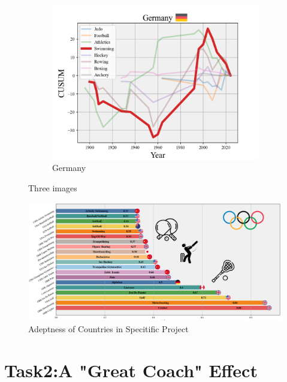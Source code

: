 \documentclass[12pt]{article}  %
\begin{document}
\begin{figure}[htbp]
\begin{subfigure}[b]{.32\textwidth}
		\includegraphics[width=\textwidth]{img/Decline3.png}
		\caption{Germany}\label{subfig:3}
	\end{subfigure}
	\caption{Three images}\label{fig:subfigures}
\end{figure}







\begin{figure}[htbp]
	\centering
	\includegraphics[width=16cm]{img/Monopolized Sports.png}
	\caption{Adeptness of Countries in Specitific Project}
	\label{fig:aa}
\end{figure}

\section{Task2:A "Great Coach" Effect}
\end{document}
